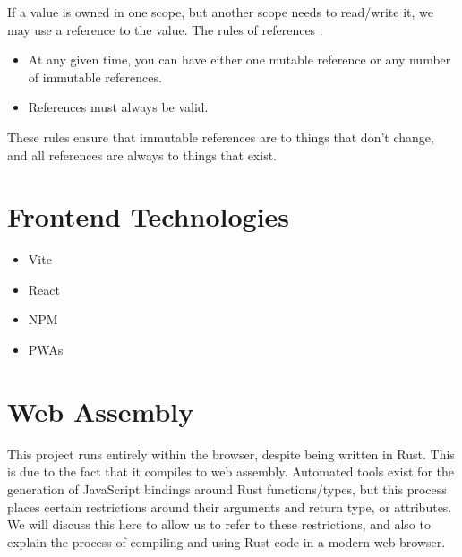 If a value is owned in one scope, but another scope needs to read/write it, we may use a reference to the value. The rules of references \cite{rust_book}:
\begin{itemize}
    \item At any given time, you can have either one mutable reference or any number of immutable references. 
    \item References must always be valid.
\end{itemize}

These rules ensure that immutable references are to things that don't change, and all references are always to things that exist.

\section{Frontend Technologies}
\label{bg:frontend}
\label{bg:pwa}
\begin{itemize}
    \item Vite
    \item React
    \item NPM
    \item PWAs
\end{itemize}


\section{Web Assembly} \label{bg:wasm}
This project runs entirely within the browser, despite being written in Rust. This is due to the fact that it compiles to web assembly. Automated tools exist for the generation of JavaScript bindings around Rust functions/types, but this process places certain restrictions around their arguments and return type, or attributes. We will discuss this here to allow us to refer to these restrictions, and also to explain the process of compiling and using Rust code in a modern web browser. 

